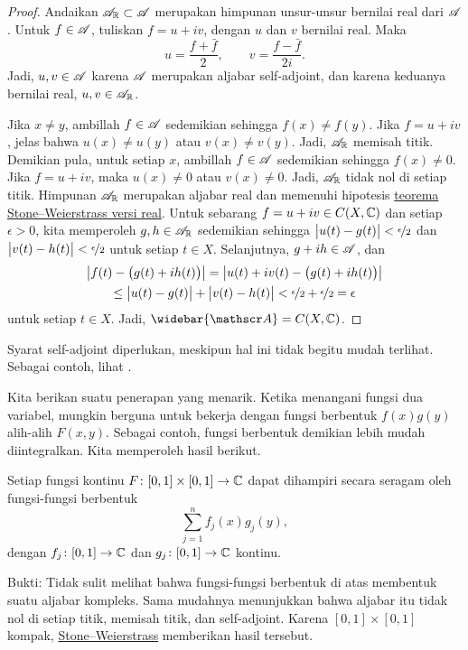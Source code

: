 \begin{proof}
Andaikan ${\mathscr{A}}_{\mathbb{R}} \subset {\mathscr{A}}$ merupakan himpunan unsur-unsur bernilai real
dari ${\mathscr{A}}$.
Untuk $f \in {\mathscr{A}}$, tuliskan $f = u+iv$, dengan $u$ dan $v$ bernilai real.
Maka
\begin{equation*}
u = \frac{f+\bar{f}}{2}, \qquad
v = \frac{f-\bar{f}}{2i} .
\end{equation*}
Jadi, $u, v \in {\mathscr{A}}$ karena ${\mathscr{A}}$ merupakan aljabar self-adjoint, dan karena
keduanya bernilai real, $u, v \in {\mathscr{A}}_{\mathbb{R}}$.

Jika $x \neq y$, ambillah $f \in {\mathscr{A}}$ sedemikian sehingga $f(x) \neq f(y)$.
Jika $f = u+iv$, jelas bahwa $u(x) \neq u(y)$ atau $v(x) \neq v(y)$.
Jadi, ${\mathscr{A}}_{\mathbb{R}}$ memisah titik.
%
Demikian pula, untuk setiap $x$, ambillah $f \in {\mathscr{A}}$ sedemikian sehingga
$f(x) \neq 0$. Jika $f = u+iv$, maka $u(x) \neq 0$ atau $v(x) \neq 0$.
Jadi, ${\mathscr{A}}_{\mathbb{R}}$ tidak nol di setiap titik.
%
Himpunan ${\mathscr{A}}_{\mathbb{R}}$ merupakan aljabar real dan memenuhi hipotesis
\hyperref[thm:SWreal]{teorema Stone--Weierstrass versi real}.
Untuk sebarang $f = u+iv \in C(X,{\mathbb{C}})$ dan setiap $\epsilon>0$, kita
memperoleh $g,h \in {\mathscr{A}}_{\mathbb{R}}$ sedemikian sehingga
$\bigl\lvert {u(t)-g(t)} \bigr\rvert < \nicefrac{\epsilon}{2}$ dan
$\bigl\lvert {v(t)-h(t)} \bigr\rvert < \nicefrac{\epsilon}{2}$ untuk setiap $t \in X$.
Selanjutnya, $g+i h \in {\mathscr{A}}$, dan
\begin{multline*}
\left\lvert {f(t) - \bigl(g(t)+ih(t)\bigr)} \right\rvert = 
\left\lvert {u(t)+iv(t) - \bigl(g(t)+ih(t)\bigr)} \right\rvert \\
\leq
\bigl\lvert {u(t)-g(t)} \bigr\rvert+\bigl\lvert {v(t)-h(t)} \bigr\rvert < \nicefrac{\epsilon}{2} +
\nicefrac{\epsilon}{2} = \epsilon
\end{multline*}
untuk setiap $t \in X$.
Jadi, $\widebar{\sA} = C(X,\C)$.
\end{proof}

Syarat self-adjoint diperlukan, meskipun hal ini tidak begitu mudah terlihat.
Sebagai contoh, lihat .

Kita berikan suatu penerapan yang menarik.
Ketika menangani fungsi dua variabel, mungkin berguna untuk bekerja dengan
fungsi berbentuk $f(x)g(y)$ alih-alih $F(x,y)$. Sebagai contoh, fungsi berbentuk
demikian lebih mudah diintegralkan. Kita memperoleh hasil berikut.

\begin{example}
Setiap fungsi kontinu $F \colon [0,1] \times [0,1] \to {\mathbb{C}}$ dapat dihampiri
secara seragam oleh fungsi-fungsi berbentuk
\begin{equation*}
\sum_{j=1}^n f_j(x) g_j(y) ,
\end{equation*}
dengan $f_j \colon [0,1] \to {\mathbb{C}}$ dan $g_j \colon [0,1] \to {\mathbb{C}}$ kontinu.

Bukti:
Tidak sulit melihat bahwa fungsi-fungsi berbentuk di atas membentuk suatu
aljabar kompleks. Sama mudahnya menunjukkan bahwa aljabar itu tidak nol di
setiap titik, memisah titik, dan self-adjoint. Karena $[0,1] \times [0,1]$
kompak, \hyperref[thm:SWcomplex]{Stone--Weierstrass} memberikan hasil tersebut.
\end{example}


